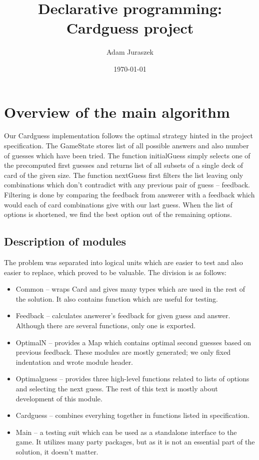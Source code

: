 \documentclass{article}
\begin{document}
\title{Declarative programming: Cardguess project}
\author{Adam Juraszek}
\date{\today}
\maketitle

\section{Overview of the main algorithm}

Our Cardguess implementation follows the optimal strategy hinted in the project specification.
The Game\-State stores list of all possible answers and also number of guesses which have been tried.
The function initialGuess simply selects one of the precomputed first guesses and returns list of all subsets of a single deck of card of the given size.
The function nextGuess first filters the list leaving only combinations which don't contradict with any previous pair of guess -- feedback.
Filtering is done by comparing the feedback from answerer with a feedback which would each of card combinations give with our last guess.
When the list of options is shortened, we find the best option out of the remaining options.

\subsection{Description of modules}

The problem was separated into logical units which are easier to test and also easier to replace, which proved to be valuable.
The division is as follows:
\begin{itemize}
\item Common -- wraps Card and gives many types which are used in the rest of the solution.
	It also contains function which are useful for testing.
\item Feedback -- calculates answerer's feedback for given guess and answer.
	Although there are several functions, only one is exported.
\item OptimalN -- provides a Map which contains optimal second guesses based on previous feedback.
	These modules are mostly generated; we only fixed indentation and wrote module header.
\item Optimalguess -- provides three high-level functions related to lists of options and selecting the next guess.
	The rest of this text is mostly about development of this module.
\item Cardguess -- combines everyhing together in functions listed in specification.
\item Main -- a testing suit which can be used as a standalone interface to the game.
	It utilizes many  party packages, but as it is not an essential part of the solution, it doesn't matter.
\end{itemize}
\end{document}
